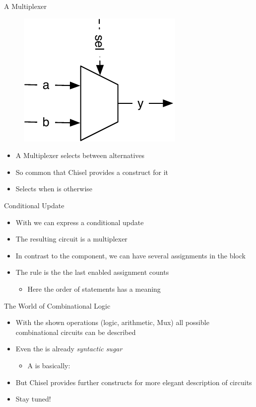 \begin{frame}[fragile]{A Multiplexer}
\begin{figure}
  \includegraphics[scale=\scale]{../figures/mux}
\end{figure}
\begin{itemize}
\item A Multiplexer selects between alternatives
\item So common that Chisel provides a construct for it
\item Selects  when  is  otherwise 
\end{itemize}
\end{frame}

\begin{frame}[fragile]{Conditional Update}
\begin{itemize}
\item With  we can express a conditional update
\item The resulting circuit is a multiplexer
\item In contrast to the  component, we can have several assignments in the  block
\item The rule is the the last enabled assignment counts
\begin{itemize}
\item Here the order of statements has a meaning
\end{itemize}
\end{itemize}
\end{frame}

\begin{frame}[fragile]{The World of Combinational Logic}
\begin{itemize}
\item With the shown operations (logic, arithmetic, Mux) all possible combinational circuits can be described
\item Even the  is already \emph{syntactic sugar}
\begin{itemize}
\item A  is basically: 
\end{itemize}
\item But Chisel provides further constructs for more elegant description of circuits
\item Stay tuned!
\end{itemize}
\end{frame}


